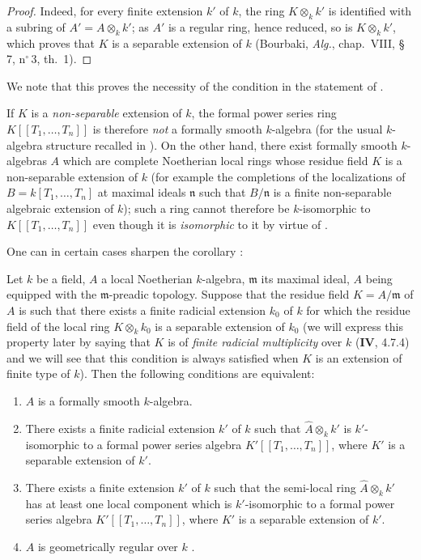 \begin{proof}
Indeed, for every finite extension $k'$ of $k$, the ring $K\otimes_k k'$ is identified with a subring of $A'=A\otimes_k k'$;
as $A'$ is a regular ring, hence reduced, so is $K\otimes_k k'$, which proves that $K$ is a separable extension of $k$ (Bourbaki, \emph{Alg.}, chap.~VIII, \S\,7, n$^\circ$\,3, th.~1).
\end{proof}

We note that this proves the necessity of the condition in the statement of .

\begin{remark}[19.6.5.2]
\label{0.19.6.5.2}
If $K$ is a \emph{non-separable} extension of $k$, the formal power series ring $K[[T_1,\ldots,T_n]]$ is therefore \emph{not} a formally smooth $k$-algebra (for the usual $k$-algebra structure recalled in ).
On the other hand, there exist formally smooth $k$-algebras $A$ which are complete Noetherian local rings whose residue field $K$ is a non-separable extension of $k$ (for example the completions of the localizations of $B=k[T_1,\ldots,T_n]$ at maximal ideals $\mathfrak{n}$ such that $B/\mathfrak{n}$ is a finite non-separable algebraic extension of $k$);
such a ring cannot therefore be $k$-isomorphic to $K[[T_1,\ldots,T_n]]$ even though it is \emph{isomorphic} to it by virtue of .

One can in certain cases sharpen the corollary :
\end{remark}

\begin{proposition}[19.6.6]
\label{0.19.6.6}
Let $k$ be a field, $A$ a local Noetherian $k$-algebra, $\mathfrak{m}$ its maximal ideal, $A$ being equipped with the $\mathfrak{m}$-preadic topology.
Suppose that the residue field $K=A/\mathfrak{m}$ of $A$ is such that there exists a finite radicial extension $k_0$ of $k$ for which the residue field of the local ring $K\otimes_k k_0$ is a separable extension of $k_0$ (we will express this property later by saying that $K$ is of \emph{finite radicial multiplicity} over $k$ ($\mathbf{IV}$, 4.7.4) and we will see that this condition is always satisfied when $K$ is an extension of finite type of $k$).
Then the following conditions are equivalent:
\begin{enumerate}
  \item[a)] $A$ is a formally smooth $k$-algebra.
  \item[b)] There exists a finite radicial extension $k'$ of $k$ such that $\widehat{A}\otimes_k k'$ is $k'$-isomorphic to a formal power series algebra $K'[[T_1,\ldots,T_n]]$, where $K'$ is a separable extension of $k'$.
  \item[b')] There exists a finite extension $k'$ of $k$ such that the semi-local ring $\widehat{A}\otimes_k k'$ has at least one local component which is $k'$-isomorphic to a formal power series algebra $K'[[T_1,\ldots,T_n]]$, where $K'$ is a separable extension of $k'$.
  \item[c)] $A$ is geometrically regular over $k$ .
\end{enumerate}
\end{proposition}

